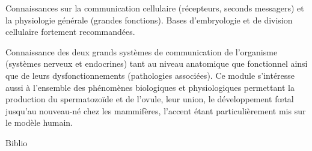 \documentclass[10pt, a5paper]{report}
\begin{document}
{Connaissances sur la communication cellulaire (récepteurs, seconds messagers) et la physiologie générale (grandes fonctions). Bases d’embryologie et de division cellulaire fortement recommandées.
} 
{\begin{itemize} 
  \ObjItem Connaissance des deux grands systèmes de communication de l’organisme (systèmes nerveux et endocrines) tant
au niveau anatomique que fonctionnel ainsi que de leurs dysfonctionnements (pathologies associées). Ce module s’intéresse
aussi à l’ensemble des phénomènes biologiques et physiologiques permettant la production du spermatozoïde et de l’ovule,
leur union, le développement fœtal jusqu’au nouveau-né chez les mammifères, l’accent étant particulièrement mis sur le
modèle humain.
\end{itemize} 
} 
{} 
{Biblio}
 
\end{document}
